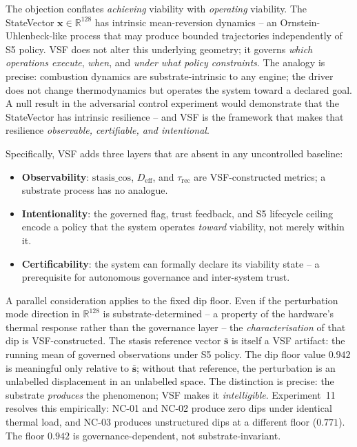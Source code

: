 \documentclass[11pt, a4paper]{article}
\begin{document}
The objection conflates \emph{achieving} viability with \emph{operating}
viability.
The StateVector $\mathbf{x} \in \mathbb{R}^{128}$ has intrinsic mean-reversion
dynamics -- an Ornstein-Uhlenbeck-like process that may produce bounded
trajectories independently of S5 policy.
VSF does not alter this underlying geometry; it governs \emph{which operations
execute}, \emph{when}, and \emph{under what policy constraints}.
The analogy is precise: combustion dynamics are substrate-intrinsic to any
engine; the driver does not change thermodynamics but operates the system toward
a declared goal.
A null result in the adversarial control experiment would demonstrate that the
StateVector has intrinsic resilience -- and VSF is the framework that makes that
resilience \emph{observable, certifiable, and intentional}.

Specifically, VSF adds three layers that are absent in any uncontrolled baseline:
\begin{itemize}
  \item \textbf{Observability}: $\text{stasis\_cos}$, $D_\text{eff}$, and
        $\tau_\text{rec}$ are VSF-constructed metrics; a substrate process has
        no analogue.
  \item \textbf{Intentionality}: the governed flag, trust feedback, and S5
        lifecycle ceiling encode a policy that the system operates \emph{toward}
        viability, not merely within it.
  \item \textbf{Certificability}: the system can formally declare its viability
        state -- a prerequisite for autonomous governance and inter-system trust.
\end{itemize}

A parallel consideration applies to the fixed dip floor.
Even if the perturbation mode direction in $\mathbb{R}^{128}$ is
substrate-determined -- a property of the hardware's thermal response rather
than the governance layer -- the \emph{characterisation} of that dip is
VSF-constructed.
The stasis reference vector $\bar{\mathbf{s}}$ is itself a VSF artifact:
the running mean of governed observations under S5 policy.
The dip floor value $0.942$ is meaningful only relative to $\bar{\mathbf{s}}$;
without that reference, the perturbation is an unlabelled displacement in an
unlabelled space.
The distinction is precise: the substrate \emph{produces} the phenomenon;
VSF makes it \emph{intelligible}.
Experiment~11 resolves this empirically: NC-01 and NC-02 produce zero dips
under identical thermal load, and NC-03 produces unstructured dips at a
different floor ($0.771$).
The floor $0.942$ is governance-dependent, not substrate-invariant.
\end{document}
